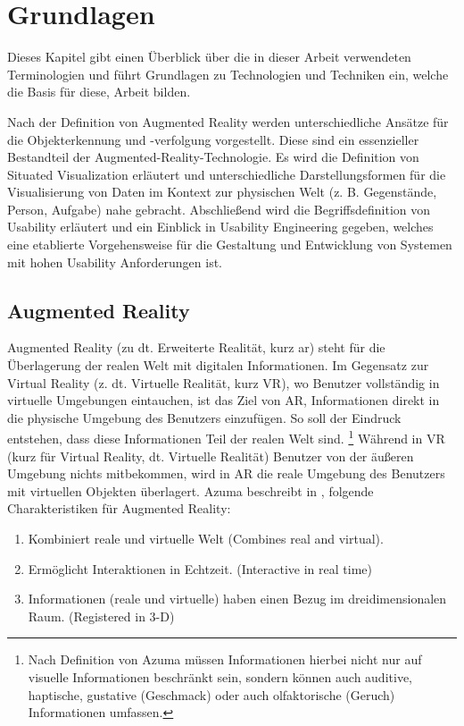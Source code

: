 \chapter{Grundlagen}\label{CapterFundamentals}

Dieses Kapitel gibt einen Überblick über die in dieser Arbeit verwendeten Terminologien und führt Grundlagen zu Technologien und Techniken ein, welche die Basis für diese, Arbeit bilden. 

Nach der Definition von Augmented Reality werden unterschiedliche Ansätze für die Objekterkennung und -verfolgung vorgestellt.  
Diese sind ein essenzieller Bestandteil der Augmented-Reality-Technologie. Es wird die Definition von Situated Visualization erläutert 
und unterschiedliche Darstellungsformen für die Visualisierung von Daten im Kontext zur physischen Welt (z. B. Gegenstände, Person, Aufgabe) nahe gebracht. 
Abschließend wird die Begriffsdefinition von Usability erläutert und ein Einblick in Usability Engineering gegeben, welches eine etablierte Vorgehensweise für die 
Gestaltung und Entwicklung von Systemen mit hohen Usability Anforderungen ist. 

\section{Augmented Reality}

Augmented Reality (zu dt. Erweiterte Realität, kurz \gls{ar}) steht für die Überlagerung der realen Welt mit digitalen Informationen. \cite{Azuma1997,DieterSchmalstieg2016} Im Gegensatz zur Virtual Reality (z. dt. Virtuelle Realität, kurz VR), wo Benutzer vollständig in virtuelle Umgebungen eintauchen,
ist das Ziel von AR, Informationen direkt in die physische Umgebung des Benutzers einzufügen. So soll der Eindruck entstehen, dass diese Informationen Teil der realen Welt sind. \footnote{Nach Definition von Azuma  müssen Informationen hierbei nicht nur auf visuelle Informationen beschränkt sein, 
sondern können auch auditive, haptische, gustative (Geschmack) oder auch olfaktorische (Geruch) Informationen umfassen.} \cite{Azuma1997} Während in VR (kurz für Virtual Reality, dt. Virtuelle Realität) Benutzer von der äußeren Umgebung nichts mitbekommen, wird in AR die reale Umgebung des Benutzers mit virtuellen 
Objekten überlagert. Azuma beschreibt in \cite{Azuma1997}, folgende Charakteristiken für Augmented Reality: 

\begin{enumerate}
	\item Kombiniert reale und virtuelle Welt (Combines real and virtual).
	\item Ermöglicht Interaktionen in Echtzeit. (Interactive in real time)
	\item Informationen (reale und virtuelle) haben einen Bezug im dreidimensionalen Raum. (Registered in 3-D)
\end{enumerate}

